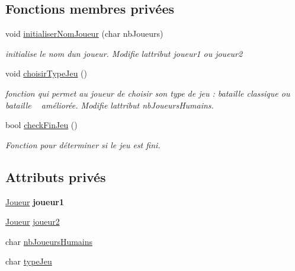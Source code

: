 \subsection*{Fonctions membres privées}
\begin{DoxyCompactItemize}
\item 
void \mbox{\hyperlink{class_jeu_bataille_navale_a72a08bdbc3562a7e1ea38dc1b3b935a2}{initialiser\+Nom\+Joueur}} (char nb\+Joueurs)
\begin{DoxyCompactList}\small\item\em initialise le nom d\textquotesingle{}un joueur. Modifie l\textquotesingle{}attribut joueur1 ou joueur2 \end{DoxyCompactList}\item 
\mbox{\label{class_jeu_bataille_navale_ad0029d6b8cf47bb3b9a00ef2986f5145}} 
void \mbox{\hyperlink{class_jeu_bataille_navale_ad0029d6b8cf47bb3b9a00ef2986f5145}{choisir\+Type\+Jeu}} ()
\begin{DoxyCompactList}\small\item\em fonction qui permet au joueur de choisir son type de jeu \+: bataille classique ou bataille ~\newline
améliorée. Modifie l\textquotesingle{}attribut nb\+Joueurs\+Humains. \end{DoxyCompactList}\item 
bool \mbox{\hyperlink{class_jeu_bataille_navale_ad23d49de0aee0b1b182c96a22cb42ffb}{check\+Fin\+Jeu}} ()
\begin{DoxyCompactList}\small\item\em Fonction pour déterminer si le jeu est fini. \end{DoxyCompactList}\end{DoxyCompactItemize}
\subsection*{Attributs privés}
\begin{DoxyCompactItemize}
\item 
\mbox{\label{class_jeu_bataille_navale_a24122527800e0958f476ae7de409f665}} 
\mbox{\hyperlink{class_joueur}{Joueur}} {\bfseries joueur1}
\item 
\mbox{\hyperlink{class_joueur}{Joueur}} \mbox{\hyperlink{class_jeu_bataille_navale_a1f339275662a73e0e17ae34a1948c5f9}{joueur2}}
\item 
char \mbox{\hyperlink{class_jeu_bataille_navale_af35393d1b2ba1d0984414fed7b887875}{nb\+Joueurs\+Humains}}
\item 
char \mbox{\hyperlink{class_jeu_bataille_navale_abac1f29d41caf119a9766f323506dbe0}{type\+Jeu}}
\end{DoxyCompactItemize}


